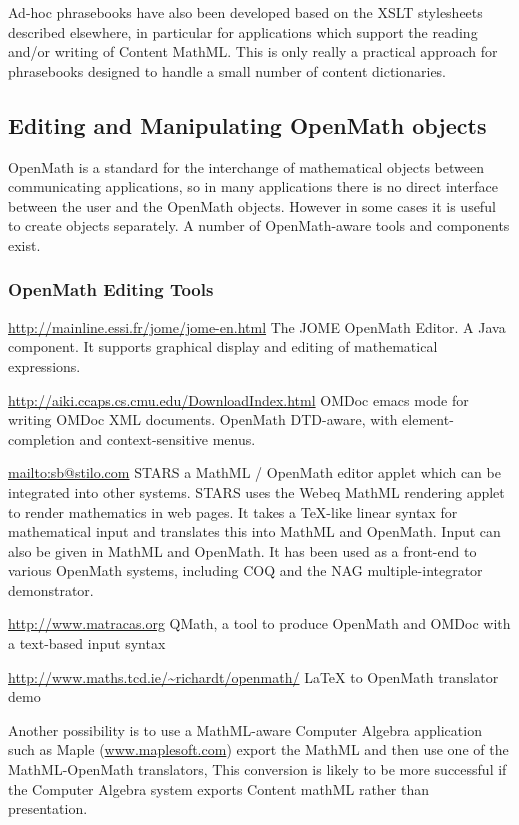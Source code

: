 \documentclass[report,keylogo]{openmath}
\begin{document}
Ad-hoc phrasebooks have also been developed based on the XSLT
stylesheets described elsewhere, in particular for applications which
support the reading and/or writing of Content MathML.  This is only
really a practical approach for phrasebooks designed to handle a small
number of content dictionaries.

\subsection {Editing and Manipulating OpenMath objects}\label{editing}

OpenMath is a standard for the interchange of mathematical objects
between communicating applications, so in many applications there is
no direct interface between the user and the OpenMath objects.
However in some cases it is useful to create objects separately.
A number of OpenMath-aware tools and components exist.

\subsubsection {OpenMath Editing Tools}
\url{http://mainline.essi.fr/jome/jome-en.html} The JOME OpenMath
Editor.  A Java component.  It supports graphical display and editing
of mathematical expressions.


\url{http://aiki.ccaps.cs.cmu.edu/DownloadIndex.html} OMDoc emacs
mode for writing OMDoc XML documents.
OpenMath DTD-aware, with element-completion and
context-sensitive menus.

\url{mailto:sb@stilo.com} STARS a MathML / OpenMath editor applet
which can be integrated into other systems.  STARS uses the Webeq
MathML rendering applet to render mathematics in web pages. It takes a
TeX-like linear syntax for mathematical input and translates this into
MathML and OpenMath.  Input can also be given in MathML and OpenMath.
It has been used as a front-end to various OpenMath systems, including
COQ and the NAG multiple-integrator demonstrator.

\url{http://www.matracas.org} QMath, a tool to produce OpenMath and
OMDoc with a text-based input syntax

\url{http://www.maths.tcd.ie/~richardt/openmath/} LaTeX to OpenMath
translator demo


Another possibility is to use a MathML-aware Computer Algebra application
such as Maple (\url{www.maplesoft.com})
export the MathML and then use one of the MathML-OpenMath translators,
This conversion is likely to be more successful if the Computer Algebra
system exports Content mathML rather than presentation. 
\end{document}
